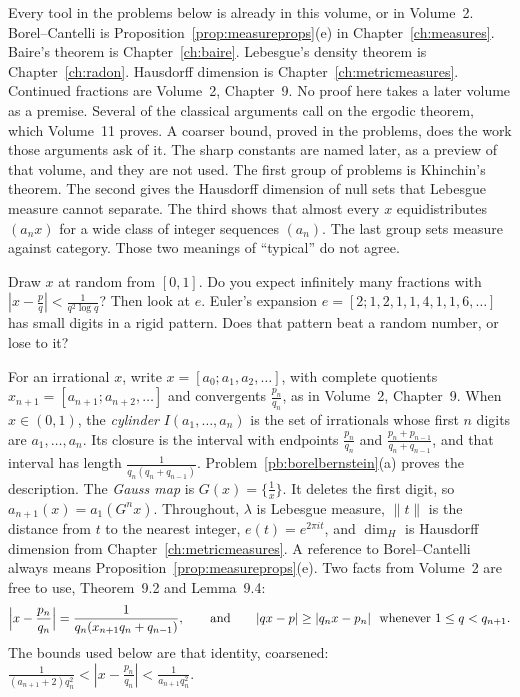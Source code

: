 Every tool in the problems below is already in this volume, or in Volume~2. Borel--Cantelli is Proposition~\ref{prop:measureprops}(e) in Chapter~\ref{ch:measures}. Baire's theorem is Chapter~\ref{ch:baire}. Lebesgue's density theorem is Chapter~\ref{ch:radon}. Hausdorff dimension is Chapter~\ref{ch:metricmeasures}. Continued fractions are Volume~2, Chapter~9. No proof here takes a later volume as a premise. Several of the classical arguments call on the ergodic theorem, which Volume~11 proves. A coarser bound, proved in the problems, does the work those arguments ask of it. The sharp constants are named later, as a preview of that volume, and they are not used. The first group of problems is Khinchin's theorem. The second gives the Hausdorff dimension of null sets that Lebesgue measure cannot separate. The third shows that almost every $x$ equidistributes $(a_nx)$ for a wide class of integer sequences $(a_n)$. The last group sets measure against category. Those two meanings of ``typical'' do not agree.

\begin{think}
Draw $x$ at random from $[0,1]$. Do you expect infinitely many fractions with $|x-\frac pq|<\frac1{q^2\log q}$? Then look at $e$. Euler's expansion $e=[2;1,2,1,1,4,1,1,6,\dots]$ has small digits in a rigid pattern. Does that pattern beat a random number, or lose to it?
\end{think}

For an irrational $x$, write $x=[a_0;a_1,a_2,\dots]$, with complete quotients $x_{n+1}=[a_{n+1};a_{n+2},\dots]$ and convergents $\frac{p_n}{q_n}$, as in Volume~2, Chapter~9. When $x\in(0,1)$, the \emph{cylinder} $I(a_1,\dots,a_n)$ is the set of irrationals whose first $n$ digits are $a_1,\dots,a_n$. Its closure is the interval with endpoints $\frac{p_n}{q_n}$ and $\frac{p_n+p_{n-1}}{q_n+q_{n-1}}$, and that interval has length $\frac1{q_n(q_n+q_{n-1})}$. Problem~\ref{pb:borelbernstein}(a) proves the description. The \emph{Gauss map} is $G(x)=\{\frac1x\}$. It deletes the first digit, so $a_{n+1}(x)=a_1(G^nx)$. Throughout, $\lambda$ is Lebesgue measure, $\|t\|$ is the distance from $t$ to the nearest integer, $e(t)=e^{2\pi it}$, and $\dim_H$ is Hausdorff dimension from Chapter~\ref{ch:metricmeasures}. A reference to Borel--Cantelli always means Proposition~\ref{prop:measureprops}(e). Two facts from Volume~2 are free to use, Theorem~9.2 and Lemma~9.4:
\[
\Bigl|x-\frac{p_n}{q_n}\Bigr|=\frac1{q_n(x_{n+1}q_n+q_{n-1})},\qquad\text{and}\qquad |qx-p|\ge|q_nx-p_n|\ \text{ whenever }1\le q<q_{n+1}.
\]
The bounds used below are that identity, coarsened: $\frac1{(a_{n+1}+2)q_n^2}<|x-\frac{p_n}{q_n}|<\frac1{a_{n+1}q_n^2}$.

